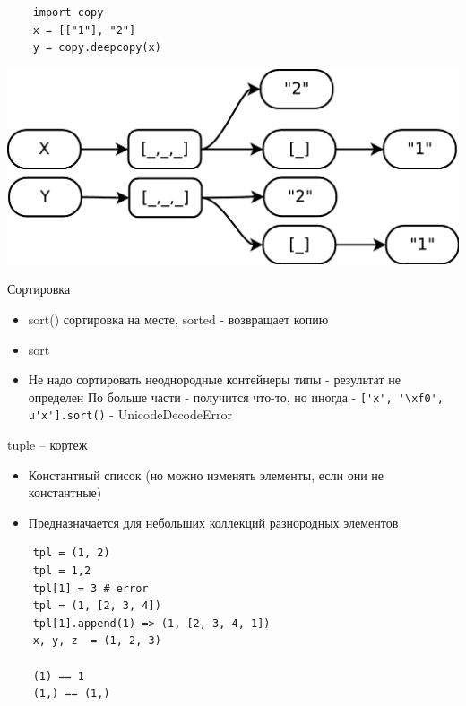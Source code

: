 \documentclass{article}
\begin{document}
\newpage

\vspace{15pt}
\begin{lstlisting}
	import copy
	x = [["1"], "2"]
	y = copy.deepcopy(x)
\end{lstlisting}
\includegraphics[scale=0.6]{images/refs_3.pdf}

\newpage

\begin{center} Сортировка \end{center}
\begin{itemize}
	\item sort() сортировка на месте, sorted - возвращает копию
	\item sort
	\item Не надо сортировать неоднородные контейнеры типы - результат не определен
		По больше части - получится что-то, но иногда -
		\lstinline!['x', '\xf0', u'x'].sort()! - UnicodeDecodeError
\end{itemize}
\newpage

\begin{center} tuple – кортеж \end{center}
\begin{itemize}
	\item Константный список (но можно изменять элементы, если они не константные)
	\item Предназначается для небольших коллекций разнородных элементов
\end{itemize}
\vspace{15pt}
\begin{lstlisting}
	tpl = (1, 2)
	tpl = 1,2
	tpl[1] = 3 # error
	tpl = (1, [2, 3, 4])
	tpl[1].append(1) => (1, [2, 3, 4, 1])
	x, y, z  = (1, 2, 3)

	(1) == 1
	(1,) == (1,)
\end{lstlisting}
\newpage
\end{document}
